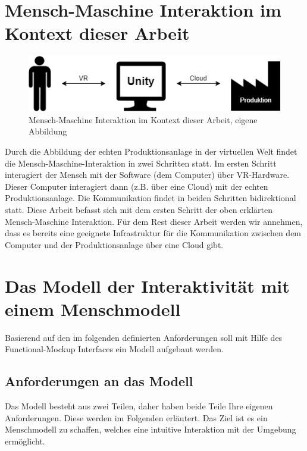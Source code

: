 \section{Mensch-Maschine Interaktion im Kontext dieser Arbeit}\label{sec:MMInteraktion}
\begin{figure}[h]
	\centering
	\includegraphics[width=0.7\linewidth]{Bilder/A19_MMI}
	\caption{Mensch-Maschine Interaktion im Kontext dieser Arbeit, eigene Abbildung}
	\label{fig:MMI}
\end{figure}
\noindent Durch die Abbildung der echten Produktionsanlage in der virtuellen Welt findet die Mensch-Maschine-Interaktion in zwei Schritten statt. Im ersten Schritt interagiert der Mensch mit der Software (dem Computer) über VR-Hardware. Dieser Computer interagiert dann (z.B. über eine Cloud) mit der echten Produktionsanlage. Die Kommunikation findet in beiden Schritten bidirektional statt.
\newline\newline
Diese Arbeit befasst sich mit dem ersten Schritt der oben erklärten Mensch-Maschine Interaktion. Für dem Rest dieser Arbeit werden wir annehmen, dass es bereits eine geeignete Infrastruktur für die Kommunikation zwischen dem Computer und der Produktionsanlage über eine Cloud gibt.

\section{Das Modell der Interaktivität mit einem Menschmodell}\label{sec:ModellAufbau}
Basierend auf den im folgenden definierten Anforderungen soll mit Hilfe des Functional-Mockup Interfaces ein Modell aufgebaut werden.

\subsection{Anforderungen an das Modell}\label{sec:AnforderungenKonzept}
Das Modell besteht aus zwei Teilen, daher haben beide Teile Ihre eigenen Anforderungen. Diese werden im Folgenden erläutert. Das Ziel ist es ein Menschmodell zu schaffen, welches eine intuitive Interaktion mit der Umgebung ermöglicht.

